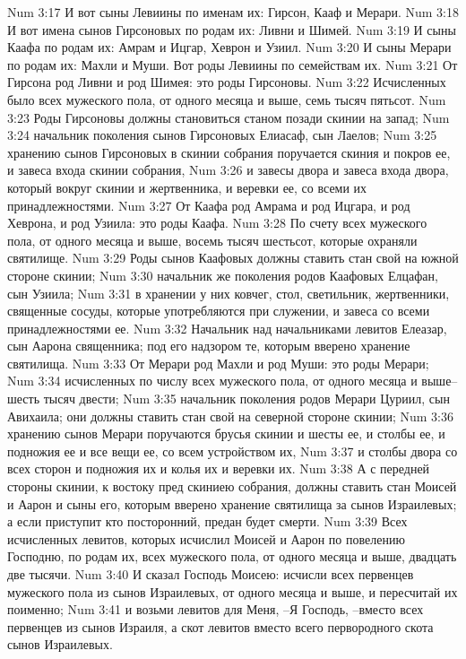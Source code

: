Num 3:17  И вот сыны Левиины по именам их: Гирсон, Кааф и Мерари.
Num 3:18  И вот имена сынов Гирсоновых по родам их: Ливни и Шимей.
Num 3:19  И сыны Каафа по родам их: Амрам и Ицгар, Хеврон и Узиил.
Num 3:20  И сыны Мерари по родам их: Махли и Муши. Вот роды Левиины по семействам их.
Num 3:21  От Гирсона род Ливни и род Шимея: это роды Гирсоновы.
Num 3:22  Исчисленных было всех мужеского пола, от одного месяца и выше, семь тысяч пятьсот.
Num 3:23  Роды Гирсоновы должны становиться станом позади скинии на запад;
Num 3:24  начальник поколения сынов Гирсоновых Елиасаф, сын Лаелов;
Num 3:25  хранению сынов Гирсоновых в скинии собрания поручается скиния и покров ее, и завеса входа скинии собрания,
Num 3:26  и завесы двора и завеса входа двора, который вокруг скинии и жертвенника, и веревки ее, со всеми их принадлежностями.
Num 3:27  От Каафа род Амрама и род Ицгара, и род Хеврона, и род Узиила: это роды Каафа.
Num 3:28  По счету всех мужеского пола, от одного месяца и выше, восемь тысяч шестьсот, которые охраняли святилище.
Num 3:29  Роды сынов Каафовых должны ставить стан свой на южной стороне скинии;
Num 3:30  начальник же поколения родов Каафовых Елцафан, сын Узиила;
Num 3:31  в хранении у них ковчег, стол, светильник, жертвенники, священные сосуды, которые употребляются при служении, и завеса со всеми принадлежностями ее.
Num 3:32  Начальник над начальниками левитов Елеазар, сын Аарона священника; под его надзором те, которым вверено хранение святилища.
Num 3:33  От Мерари род Махли и род Муши: это роды Мерари;
Num 3:34  исчисленных по числу всех мужеского пола, от одного месяца и выше--шесть тысяч двести;
Num 3:35  начальник поколения родов Мерари Цуриил, сын Авихаила; они должны ставить стан свой на северной стороне скинии;
Num 3:36  хранению сынов Мерари поручаются брусья скинии и шесты ее, и столбы ее, и подножия ее и все вещи ее, со всем устройством их,
Num 3:37  и столбы двора со всех сторон и подножия их и колья их и веревки их.
Num 3:38  А с передней стороны скинии, к востоку пред скиниею собрания, должны ставить стан Моисей и Аарон и сыны его, которым вверено хранение святилища за сынов Израилевых; а если приступит кто посторонний, предан будет смерти.
Num 3:39  Всех исчисленных левитов, которых исчислил Моисей и Аарон по повелению Господню, по родам их, всех мужеского пола, от одного месяца и выше, двадцать две тысячи.
Num 3:40  И сказал Господь Моисею: исчисли всех первенцев мужеского пола из сынов Израилевых, от одного месяца и выше, и пересчитай их поименно;
Num 3:41  и возьми левитов для Меня, --Я Господь, --вместо всех первенцев из сынов Израиля, а скот левитов вместо всего первородного скота сынов Израилевых.

